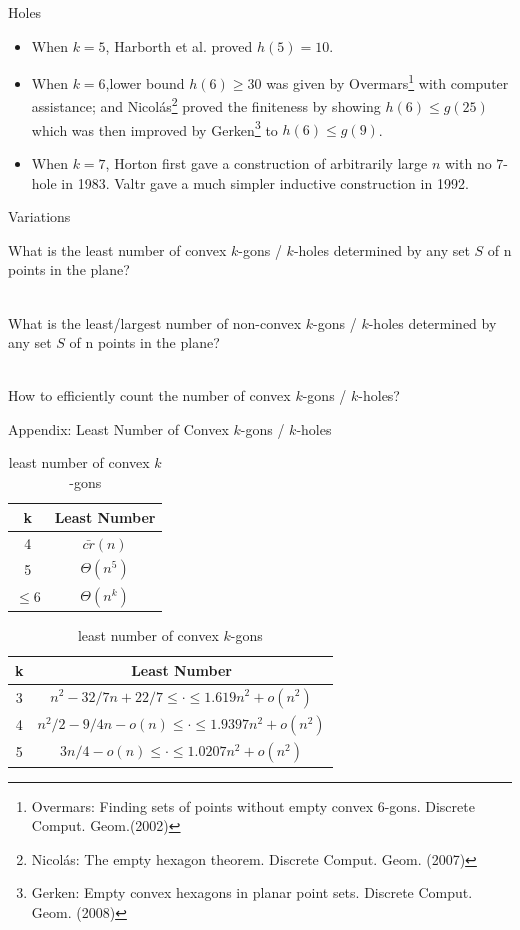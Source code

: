 \documentclass{beamer}
\begin{document}
\begin{frame}{Holes}
    
\begin{itemize}
\item 
When $k=5$, Harborth et al. proved $h(5)=10$.
\item 
When $k=6$,lower bound $h(6) \ge 30$ was given by Overmars\footnote{Overmars: Finding sets of points without empty convex 6-gons. Discrete Comput. Geom.(2002)} with computer assistance; and Nicol\'as\footnote{Nicolás: The empty hexagon theorem. Discrete Comput. Geom. (2007)} proved the finiteness by showing $h(6) \le g(25)$ which was then improved by Gerken\footnote{Gerken: Empty convex hexagons in planar point sets. Discrete Comput. Geom. (2008)} to $h(6) \le g(9)$.
\item 
When $k=7$, Horton first gave a construction of arbitrarily large $n$ with no $7$-hole in 1983. Valtr gave a much simpler inductive construction  in 1992. 


\end{itemize}
\end{frame}

\begin{frame}{Variations}

What is the least number of convex $k$-gons / $k$-holes determined by any set $S$ of n points in the plane? \\~\ 

What is the least/largest number of non-convex $k$-gons / $k$-holes determined by any set $S$ of n points in the plane? \\~\ 

How to efficiently count the number of convex $k$-gons / $k$-holes?

\end{frame}

\begin{frame}{Appendix: Least Number of Convex $k$-gons / $k$-holes}

\begin{table}
\begin{tabular}{c|c}
k & Least Number \\ 
\hline \hline
4 & $\bar{cr}(n)$ \\
5 & $\Theta(n^5)$ \\ 
$\le 6$ & $\Theta(n^k)$
\end{tabular}

\caption{least number of convex $k$-gons}

\begin{tabular}{c|c}
k & Least Number \\ 
\hline \hline
3 & $n^2 - 32/7n + 22/7 \le \cdot \le 1.619n^2 + o(n^2)$ \\
4 & $n^2/2 -9/4n -o(n) \le \cdot \le 1.9397n^2 + o(n^2)$ \\ 
5 & $3n/4-o(n)\le \cdot \le 1.0207n^2 + o(n^2)$
\end{tabular}
\caption{least number of convex $k$-gons}
\end{table}
\end{frame}
\end{document}
